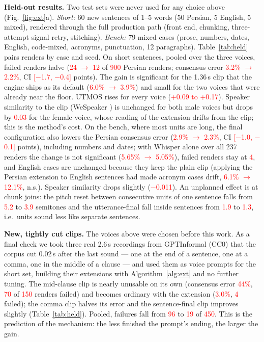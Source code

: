 \documentclass[conference]{IEEEtran}
\newcommand{\RES}[1]{\textcolor{red}{#1}}
\begin{document}
\textbf{Held-out results.} Two test sets were never used for any choice above (Fig.~\ref{fig:ext}a). \emph{Short:} 60 new
sentences of 1--5 words (50 Persian, 5 English, 5 mixed), rendered through the full production path (front
end, chunking, three-attempt signal retry, stitching). \emph{Bench:} 79 mixed cases (prose, numbers, dates,
English, code-mixed, acronyms, punctuation, 12 paragraphs). Table~\ref{tab:held} pairs renders by case and
seed. On short sentences, pooled over the three voices, failed renders halve (\RES{24 $\to$ 12} of
\RES{900} Persian renders; consensus error \RES{3.2\% $\to$ 2.2\%}, CI \RES{[$-$1.7, $-$0.4]} points). The
gain is significant for the 1.36\,s clip that the engine ships as its default (\RES{6.0\% $\to$ 3.9\%}) and
small for the two voices that were already near the floor. UTMOS \cite{utmos2022} rises for every voice
(\RES{+0.09 to +0.17}). Speaker similarity to the clip (WeSpeaker \cite{wespeaker2023}) is unchanged for both
male voices but drops by \RES{0.03} for the female voice, whose reading of the extension drifts from the
clip; this is the method's cost. On the bench, where most units are long, the final configuration also lowers the
Persian consensus error (\RES{2.9\% $\to$ 2.3\%}, CI \RES{[$-$1.0, $-$0.1]} points), including numbers and
dates; with Whisper alone over all 237 renders the change is not significant (\RES{5.65\% $\to$ 5.05\%}),
failed renders stay at \RES{4}, and English cases are unchanged because they keep the plain clip (applying
the Persian extension to English sentences had made acronym cases drift, \RES{6.1\% $\to$ 12.1\%}, n.s.).
Speaker similarity drops slightly (\RES{$-$0.011}). An unplanned effect is at chunk joins: the pitch reset
between consecutive units of one sentence falls from \RES{5.2} to \RES{3.9} semitones and the
utterance-final fall inside sentences from \RES{1.9} to \RES{1.3}, i.e.\ units sound less like separate
sentences.

\textbf{New, tightly cut clips.} The voices above were chosen before this work. As a final check we took
three real 2.6\,s recordings from GPTInformal (CC0) that the corpus cut 0.02\,s after the last sound --- one
at the end of a sentence, one at a comma, one in the middle of a clause --- and used them as voice prompts
for the short set, building their extensions with Algorithm~\ref{alg:ext} and no further tuning. The
mid-clause clip is nearly unusable on its own (consensus error \RES{44\%}, \RES{70} of \RES{150} renders
failed) and becomes ordinary with the extension (\RES{3.0\%}, \RES{4} failed); the comma clip halves its
error and the sentence-final clip improves slightly (Table~\ref{tab:held}). Pooled, failures fall from
\RES{96} to \RES{19} of \RES{450}. This is the prediction of the mechanism: the less finished the prompt's
ending, the larger the gain.
\end{document}

